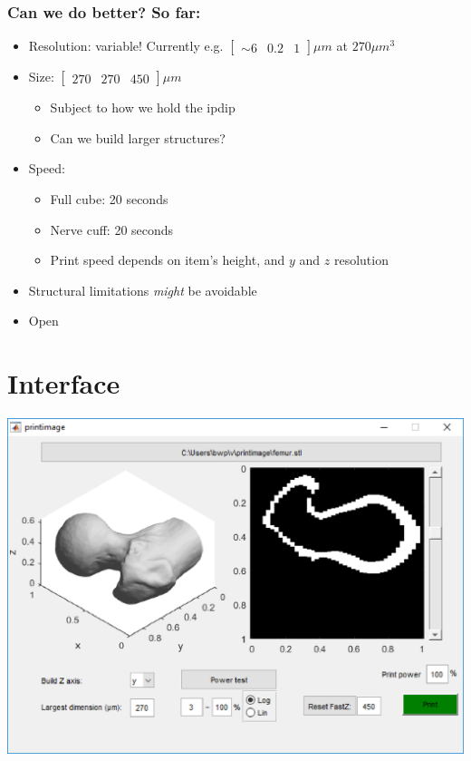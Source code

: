 \documentclass{beamer}
\begin{document}
\begin{frame}
  \frametitle{Can we do better?  So far:}
  \begin{itemize}
  \item Resolution: variable! Currently e.g. $\left[ \begin{array}{ccc}\sim 6 & 0.2 & 1
    \end{array}\right]\mu m$ at $270 \mu m^3$
  \item Size: $\left[ \begin{array}{ccc} 270 & 270 & 450
    \end{array}\right]\mu m$
    \begin{itemize}
      \item Subject to how we hold the ipdip
    \item Can we build larger structures?
    \end{itemize}
  \item Speed:
    \begin{itemize}
    \item Full cube: 20 seconds
    \item Nerve cuff: 20 seconds
    \item Print speed depends on item's height, and $y$ and $z$ resolution
    \end{itemize}
  \item Structural limitations {\em might} be avoidable
  \item Open
  \end{itemize}
\end{frame}

\section{Interface}

\begin{frame}
  \includegraphics[width=\textwidth]{printimage}
\end{frame}
\end{document}
